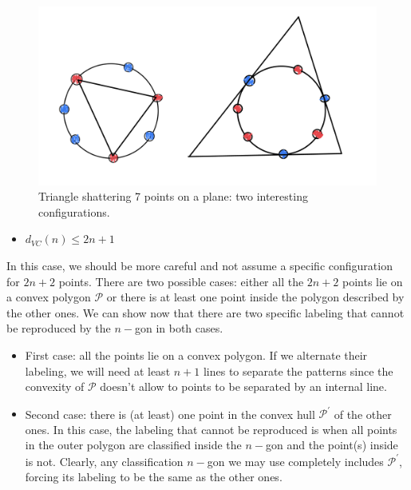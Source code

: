 \documentclass[11pt]{article}
\providecommand{\tightlist}{%
      \setlength{\itemsep}{0pt}\setlength{\parskip}{0pt}}
\begin{document}
 \begin{figure}
    \centering
    \includegraphics[scale=0.8]{Pset 3/IMG_0164.jpg}
    \caption{Triangle shattering 7 points on a plane: two interesting configurations.}
    \label{fig:my_label}
\end{figure}
        
    \begin{itemize}
\tightlist
\item
  \(d_{VC}(n)\le 2n+1\)
\end{itemize}

In this case, we should be more careful and not assume a specific
configuration for \(2n+2\) points. There are two possible cases: either
all the \(2n+2\) points lie on a convex polygon \(\mathcal{P}\) or there
is at least one point inside the polygon described by the other ones. We
can show now that there are two specific labeling that cannot be
reproduced by the \(n-\)gon in both cases.

\begin{itemize}
\item
  First case: all the points lie on a convex polygon. If we alternate
  their labeling, we will need at least \(n+1\) lines to separate the
  patterns since the convexity of \(\mathcal{P}\) doesn't allow to
  points to be separated by an internal line.
\item
  Second case: there is (at least) one point in the convex hull
  \(\mathcal{P}^\prime\) of the other ones. In this case, the labeling
  that cannot be reproduced is when all points in the outer polygon are
  classified inside the \(n-\)gon and the point(s) inside is not.
  Clearly, any classification \(n-\)gon we may use completely includes
  \(\mathcal{P}^\prime\), forcing its labeling to be the same as the
  other ones.
\end{itemize}
\end{document}
